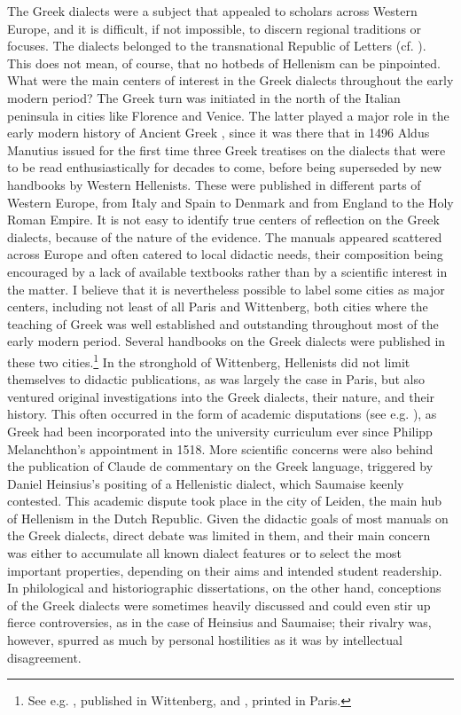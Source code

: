 The Greek dialects were a subject that appealed to scholars across Western Europe, and it is difficult, if not impossible, to discern regional traditions or focuses. The dialects belonged to the transnational Republic of Letters (cf. \citealt{Bots1997}). This does not mean, of course, that no hotbeds of Hellenism can be pinpointed. What were the main centers of interest in the Greek dialects throughout the early modern period? The Greek turn was initiated in the north of the Italian peninsula in cities like Florence and Venice. The latter played a major role in the early modern history of Ancient Greek , since it was there that in 1496 Aldus Manutius issued for the first time three Greek treatises on the dialects that were to be read enthusiastically for decades to come, before being superseded by new handbooks by Western Hellenists. These were published in different parts of Western Europe, from Italy and Spain to Denmark and from England to the Holy Roman Empire. It is not easy to identify true centers of reflection on the Greek dialects, because of the nature of the evidence. The manuals appeared scattered across Europe and often catered to local didactic needs, their composition being encouraged by a lack of available textbooks rather than by a scientific interest in the matter. I believe that it is nevertheless possible to label some cities as major centers, including not least of all Paris and Wittenberg, both cities where the teaching of Greek was well established and outstanding throughout most of the early modern period. Several handbooks on the Greek dialects were published in these two cities.\footnote{See e.g. \citet{Schmidt1604}, published in Wittenberg, and \citet{Merigon1621}, printed in Paris.} In the  stronghold of Wittenberg, Hellenists did not limit themselves to didactic publications, as was largely the case in Paris, but also ventured original investigations into the Greek dialects, their nature, and their history. This often occurred in the form of academic disputations (see e.g. \citealt{Thryllitsch1709}), as Greek had been incorporated into the university curriculum ever since Philipp Melanchthon’s appointment in 1518. More scientific concerns were also behind the publication of Claude de  commentary on the Greek language, triggered by Daniel Heinsius’s positing of a Hellenistic dialect, which Saumaise keenly contested. This academic dispute took place in the city of Leiden, the main hub of Hellenism in the Dutch Republic. Given the didactic goals of most manuals on the Greek dialects, direct debate was limited in them, and their main concern was either to accumulate all known dialect features or to select the most important properties, depending on their aims and intended student readership. In philological and historiographic dissertations, on the other hand, conceptions of the Greek dialects were sometimes heavily discussed and could even stir up fierce controversies, as in the case of Heinsius and Saumaise; their rivalry was, however, spurred as much by personal hostilities as it was by intellectual disagreement.

